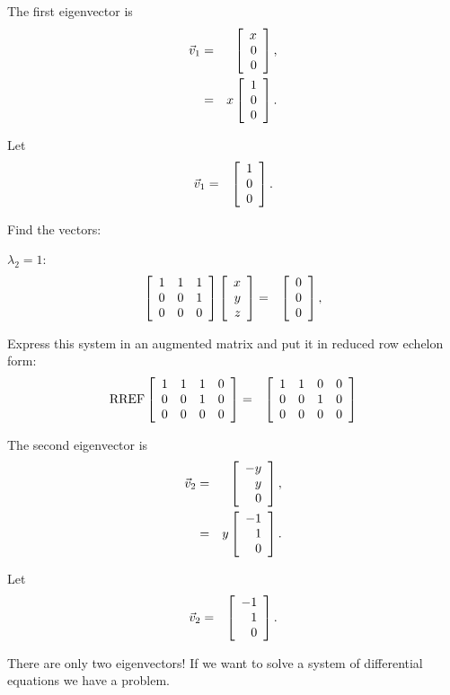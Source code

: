 \begin{frame}
  The first eigenvector is 
  \begin{eqnarray*}
    \vec{v}_1 & = & \left[ \begin{array}{r} x \\ 0 \\ 0 \end{array} \right], \\
    & = & x \left[ \begin{array}{r} 1 \\ 0 \\ 0 \end{array} \right].
  \end{eqnarray*}

  Let
  \begin{eqnarray*}
    \vec{v}_1 & = & \left[ \begin{array}{r} 1 \\ 0 \\ 0 \end{array} \right].
  \end{eqnarray*}

\end{frame}

\begin{frame}
  Find the vectors:

  $\lambda_2 = 1$:
  \begin{eqnarray*}
    \left[ \begin{array}{rrr} 1 & 1 & 1 \\ 0 & 0 & 1 \\ 0 & 0 & 0 \end{array} \right]
    \left[ \begin{array}{r} x \\ y \\ z \end{array} \right] & = & \left[ \begin{array}{r} 0 \\ 0 \\ 0 \end{array} \right], \\
  \end{eqnarray*}

  Express this system in an augmented matrix and put it in reduced row
  echelon form:
  \begin{eqnarray*}
    \mathrm{RREF}\left[ \begin{array}{rrrr}
    1 & 1 & 1 & 0 \\  
    0 & 0 & 1 & 0 \\ 
    0 & 0 & 0 & 0 \\ 
    \end{array} \right]
    & = & 
    \left[ \begin{array}{rrrr}
    1 & 1 & 0 & 0 \\  
    0 & 0 & 1 & 0 \\ 
    0 & 0 & 0 & 0 \\ 
    \end{array} \right]
  \end{eqnarray*}

\end{frame}

\begin{frame}

  The second eigenvector is 
  \begin{eqnarray*}
    \vec{v}_2 & = & \left[ \begin{array}{r} -y \\ y \\ 0 \end{array} \right], \\
    & = & y \left[ \begin{array}{r} -1 \\ 1 \\ 0 \end{array} \right].
  \end{eqnarray*}

  Let
  \begin{eqnarray*}
    \vec{v}_2 & = & \left[ \begin{array}{r} -1 \\ 1 \\ 0 \end{array} \right].
  \end{eqnarray*}

  There are only two eigenvectors! If we want to solve a system of
  differential equations we have a problem.

\end{frame}




